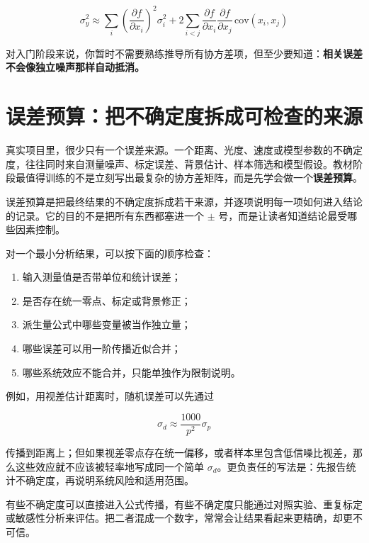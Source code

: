 \[
\sigma_y^2 \approx \sum_i \left(\frac{\partial f}{\partial x_i}\right)^2 \sigma_i^2
+ 2\sum_{i<j}\frac{\partial f}{\partial x_i}\frac{\partial f}{\partial x_j}\,\mathrm{cov}(x_i,x_j)
\]

对入门阶段来说，你暂时不需要熟练推导所有协方差项，但至少要知道：\textbf{相关误差不会像独立噪声那样自动抵消。}

\section{误差预算：把不确定度拆成可检查的来源}

真实项目里，很少只有一个误差来源。一个距离、光度、速度或模型参数的不确定度，往往同时来自测量噪声、标定误差、背景估计、样本筛选和模型假设。教材阶段最值得训练的不是立刻写出最复杂的协方差矩阵，而是先学会做一个\textbf{误差预算}。

\begin{defbox}[误差预算]
误差预算是把最终结果的不确定度拆成若干来源，并逐项说明每一项如何进入结论的记录。它的目的不是把所有东西都塞进一个 $\pm$ 号，而是让读者知道结论最受哪些因素控制。
\end{defbox}

对一个最小分析结果，可以按下面的顺序检查：

\begin{enumerate}
    \item 输入测量值是否带单位和统计误差；
    \item 是否存在统一零点、标定或背景修正；
    \item 派生量公式中哪些变量被当作独立量；
    \item 哪些误差可以用一阶传播近似合并；
    \item 哪些系统效应不能合并，只能单独作为限制说明。
\end{enumerate}

例如，用视差估计距离时，随机误差可以先通过

\[
\sigma_d \approx \frac{1000}{p^2}\sigma_p
\]

传播到距离上；但如果视差零点存在统一偏移，或者样本里包含低信噪比视差，那么这些效应就不应该被轻率地写成同一个简单 $\sigma_d$。更负责任的写法是：先报告统计不确定度，再说明系统风险和适用范围。

\begin{protip}
有些不确定度可以直接进入公式传播，有些不确定度只能通过对照实验、重复标定或敏感性分析来评估。把二者混成一个数字，常常会让结果看起来更精确，却更不可信。
\end{protip}

